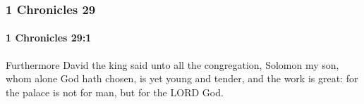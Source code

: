 	\subsubsection{1 Chronicles 29} %
		\label{1CHRONICLES-29}

		\paragraph{1 Chronicles 29:1} %
			\label{1CHRONICLES-29-1}

			Furthermore David the king said unto all the congregation, Solomon my son, whom alone God hath chosen, is yet young and tender, and the work is great: for the palace is not for man, but for the LORD God.


